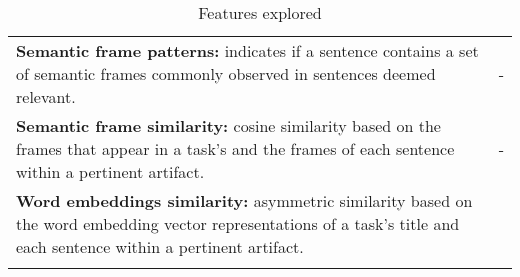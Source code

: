 \begin{table}[!b]
\begin{small}
\begin{tabular}{lr}
\parbox[l][1cm][c]{11cm}{ 
    \textbf{Semantic frame patterns:} indicates if a sentence contains a set of semantic 
    frames commonly observed in sentences deemed relevant.    
} & - \\  

\parbox[l][1cm][c]{11cm}{ 
    \textbf{Semantic frame similarity:} cosine similarity based on the frames that appear 
    in a task's and the frames of each sentence within a pertinent artifact.
} & - \\  

\parbox[l][1.2cm][c]{11cm}{ 
    \textbf{Word embeddings similarity:} asymmetric similarity based on the word embedding vector representations of a task's title and each sentence within a pertinent artifact.
} & \cite{Xu2017, silva2019} \\  


\parbox[l][0.5cm][c]{11cm}{ 
} & \\  

\hline

\end{tabular}
\end{small}
\caption{Features explored}
\label{tbl:approach-textual-features}
\end{table}




